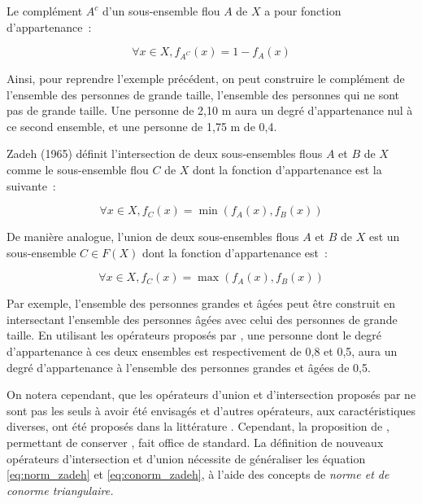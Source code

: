 Le complément $A^c$ d’un sous-ensemble flou $A$ de $X$ a pour fonction
d’appartenance :

\begin{equation}
  ∀x ∈ X, f_{A^C}(x) = 1 − f_A(x)
\end{equation}

Ainsi, pour reprendre l’exemple précédent, on peut construire le
complément de l’ensemble des personnes de grande taille, l’ensemble
des personnes qui ne sont pas de grande taille. Une personne de 2,10 m
aura un degré d’appartenance nul à ce second ensemble, et une personne
de 1,75 m de 0,4.

Zadeh (1965) définit l’intersection de deux sous-ensembles flous $A$
et $B$ de $X$ comme le sous-ensemble flou $C$ de $X$ dont la fonction
d’appartenance est la suivante :

\begin{equation}
  \label{eq:norm_zadeh}
  ∀x ∈ X, f_C (x) = \min(f_A(x), f_B(x))
\end{equation}

De manière analogue, l’union de deux sous-ensembles flous $A$ et $B$
de $X$ est un sous-ensemble $C ∈ F(X)$ dont la fonction d’appartenance
est :

\begin{equation}
  \label{eq:conorm_zadeh}
  ∀x ∈ X, f_C (x) = \max(f_A(x), f_B(x))
\end{equation}

Par exemple, l’ensemble des personnes grandes et âgées peut être
construit en intersectant l’ensemble des personnes âgées avec celui
des personnes de grande taille. En utilisant les opérateurs proposés
par \textcite{Zadeh1965}, une personne dont le degré d’appartenance à
ces deux ensembles est respectivement de 0,8 et 0,5, aura un degré
d’appartenance à l’ensemble des personnes grandes et âgées de 0,5.

On notera cependant, que les opérateurs d’union et d’intersection
proposés par \textcite{Zadeh1965} ne sont pas les seuls à avoir été
envisagés et d’autres opérateurs, aux caractéristiques diverses, ont
été proposés dans la littérature
\autocite{Klir1995,Bouchon-Meunier1995}. Cependant, la proposition de
\textcite{Zadeh1965}, permettant de conserver
, fait office de standard. La
définition de nouveaux opérateurs d'intersection et d'union nécessite
de généraliser les équation \ref{eq:norm_zadeh} et
\ref{eq:conorm_zadeh}, à l'aide des concepts de \emph{norme \emph{et
    de} conorme triangulaire.}

